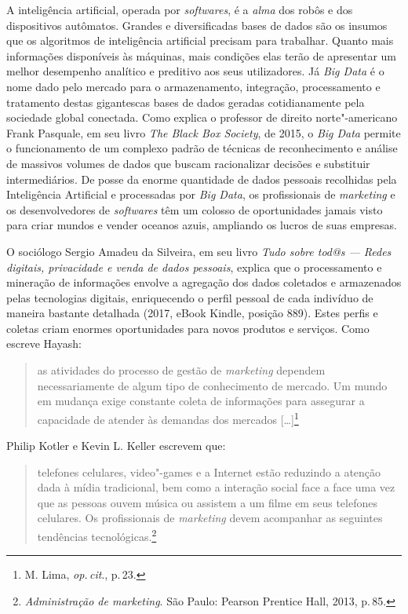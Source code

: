 A inteligência artificial, operada por \textit{softwares}, é a \textit{alma}
dos robôs e dos dispositivos autômatos. Grandes e diversificadas bases
de dados são os insumos que os algoritmos de inteligência artificial
precisam para trabalhar. Quanto mais informações disponíveis às
máquinas, mais condições elas terão de apresentar um melhor desempenho
analítico e preditivo aos seus utilizadores. Já \textit{Big Data} é o nome
dado pelo mercado para o armazenamento, integração, processamento e
tratamento destas gigantescas bases de dados geradas cotidianamente pela
sociedade global conectada. Como explica o professor de direito
norte"-americano Frank Pasquale, em seu livro \textit{The Black Box
Society}, de 2015, o \textit{Big Data} permite o funcionamento de um
complexo padrão de técnicas de reconhecimento e análise de massivos
volumes de dados que buscam racionalizar decisões e substituir
intermediários. De posse da enorme quantidade de dados pessoais
recolhidas pela Inteligência Artificial e processadas por \textit{Big
Data}, os profissionais de \textit{marketing} e os desenvolvedores de \textit{softwares}
têm um colosso de oportunidades jamais visto para criar mundos e vender
oceanos azuis, ampliando os lucros de suas empresas.

O sociólogo Sergio Amadeu da Silveira, em seu livro \textit{Tudo sobre tod@s --- Redes digitais, privacidade e venda
de dados pessoais}, explica que o processamento e mineração de
informações envolve a agregação dos dados coletados e armazenados pelas
tecnologias digitais, enriquecendo o perfil pessoal de cada indivíduo de
maneira bastante detalhada (2017, eBook Kindle, posição 889). Estes
perfis e coletas criam enormes oportunidades para novos produtos e
serviços. Como escreve Hayash:

\begin{quote}
as atividades do processo de gestão de \textit{marketing} dependem necessariamente de algum tipo de conhecimento de mercado. Um mundo em mudança exige constante coleta de
informações para assegurar a capacidade de atender às demandas dos
mercados {[}\ldots{}{]}\footnote{M. Lima, \textit{op.\,cit}., p.\,23.}
\end{quote}

Philip Kotler e Kevin L. Keller escrevem que:

\begin{quote}
telefones celulares, video"-games e a Internet estão reduzindo a
atenção dada à mídia tradicional, bem como a interação social face a
face uma vez que as pessoas ouvem música ou assistem a um filme em seus
telefones celulares. Os profissionais de \textit{marketing} devem acompanhar as
seguintes tendências tecnológicas.\footnote{\textit{Administração de
marketing}. São Paulo: Pearson Prentice Hall, 2013, p.\,85.}
\end{quote}

